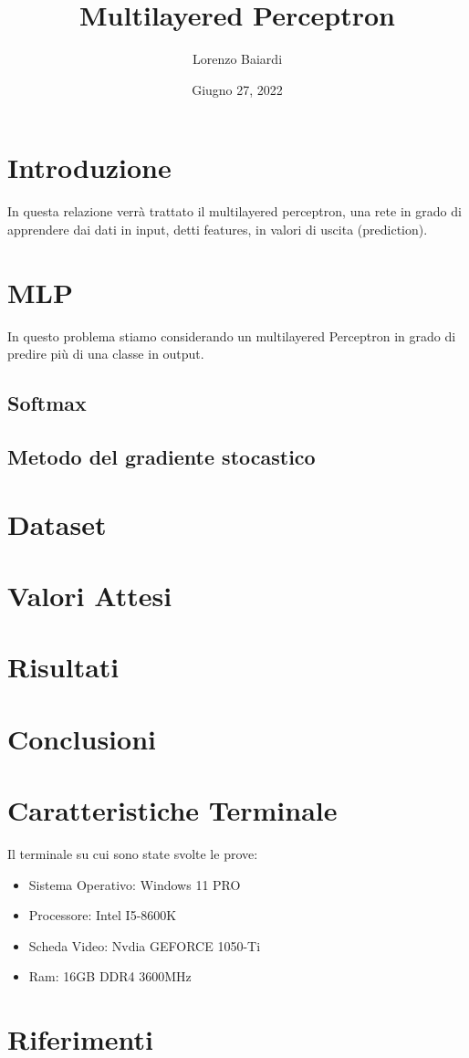 \documentclass{article}
\title{Multilayered Perceptron}
\author{Lorenzo Baiardi}
\date{Giugno 27, 2022}
\begin{document}
\maketitle

    \section{Introduzione}\label{sec:introduzione}
        In questa relazione verrà trattato il multilayered perceptron, una rete in grado di apprendere dai dati in input,
        detti features, in valori di uscita (prediction).
    \section{MLP}\label{sec:tipologia}
        In questo problema stiamo considerando un multilayered Perceptron in grado di predire più di una classe in output.
    \subsection{Softmax}\label{subsec:softmax}
    \subsection{Metodo del gradiente stocastico}\label{subsec:metodo-del-gradiente-stocastico}
    \section{Dataset}\label{sec:dataset}
    \section{Valori Attesi}\label{sec:valori-attesi}
    \section{Risultati}\label{sec:risultati}
    \section{Conclusioni}\label{sec:conclusioni}
    \section{Caratteristiche Terminale}\label{sec:caratteristiche-terminale}
        Il terminale su cui sono state svolte le prove:
        \begin{itemize}
            \item Sistema Operativo: Windows 11 PRO
            \item Processore: Intel I5-8600K
            \item Scheda Video: Nvdia GEFORCE 1050-Ti
            \item Ram: 16GB DDR4 3600MHz
        \end{itemize}
    \section{Riferimenti}\label{sec:riferimenti}
\end{document}
